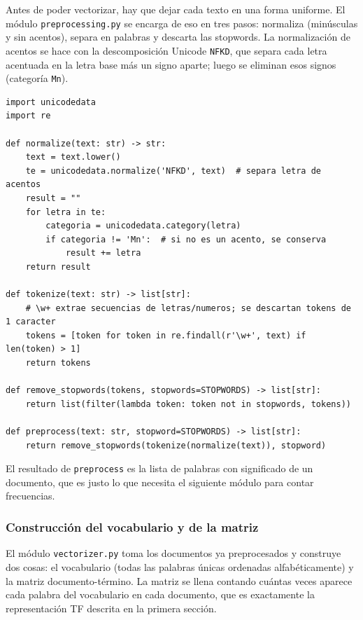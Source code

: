\documentclass[12pt,a4paper]{article}
\begin{document}
Antes de poder vectorizar, hay que dejar cada texto en una forma uniforme. El módulo \texttt{preprocessing.py} se encarga de eso en tres pasos: normaliza (minúsculas y sin acentos), separa en palabras y descarta las stopwords. La normalización de acentos se hace con la descomposición Unicode \texttt{NFKD}, que separa cada letra acentuada en la letra base más un signo aparte; luego se eliminan esos signos (categoría \texttt{Mn}).

\begin{lstlisting}[caption={Limpieza y tokenización del texto (\texttt{preprocessing.py}).}]
import unicodedata
import re

def normalize(text: str) -> str:
    text = text.lower()
    te = unicodedata.normalize('NFKD', text)  # separa letra de acentos
    result = ""
    for letra in te:
        categoria = unicodedata.category(letra)
        if categoria != 'Mn':  # si no es un acento, se conserva
            result += letra
    return result

def tokenize(text: str) -> list[str]:
    # \w+ extrae secuencias de letras/numeros; se descartan tokens de 1 caracter
    tokens = [token for token in re.findall(r'\w+', text) if len(token) > 1]
    return tokens

def remove_stopwords(tokens, stopwords=STOPWORDS) -> list[str]:
    return list(filter(lambda token: token not in stopwords, tokens))

def preprocess(text: str, stopword=STOPWORDS) -> list[str]:
    return remove_stopwords(tokenize(normalize(text)), stopword)
\end{lstlisting}

El resultado de \texttt{preprocess} es la lista de palabras con significado de un documento, que es justo lo que necesita el siguiente módulo para contar frecuencias.

\subsubsection{Construcción del vocabulario y de la matriz}

El módulo \texttt{vectorizer.py} toma los documentos ya preprocesados y construye dos cosas: el vocabulario (todas las palabras únicas ordenadas alfabéticamente) y la matriz documento-término. La matriz se llena contando cuántas veces aparece cada palabra del vocabulario en cada documento, que es exactamente la representación TF descrita en la primera sección.
\end{document}
